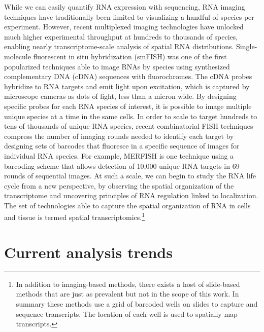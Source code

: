 \begin{dissertationintroduction}
While we can easily quantify RNA expression with sequencing, RNA imaging techniques have traditionally been limited to visualizing a handful of species per experiment. However, recent multiplexed imaging technologies have unlocked much higher experimental throughput at hundreds to thousands of species, enabling nearly transcriptome-scale analysis of spatial RNA distributions. Single-molecule fluorescent in situ hybridization\cite{rajImagingIndividualMRNA2008} (smFISH) was one of the first popularized techniques able to image RNAs by species using synthesized complementary DNA (cDNA) sequences with fluorochromes. The cDNA probes hybridize to RNA targets and emit light upon excitation, which is captured by microscope cameras as dots of light, less than a micron wide. By designing specific probes for each RNA species of interest, it is possible to image multiple unique species at a time in the same cells. In order to scale to target hundreds to tens of thousands of unique RNA species, recent combinatorial FISH techniques compress the number of imaging rounds needed to identify each target by designing sets of barcodes that fluoresce in a specific sequence of images for individual RNA species. For example, MERFISH\cite{chenSpatiallyResolvedHighly2015} is one technique using a barcoding scheme that allows detection of 10,000 unique RNA targets in 69 rounds of sequential images. At such a scale, we can begin to study the RNA life cycle from a new perspective, by observing the spatial organization of the transcriptome and uncovering principles of RNA regulation linked to localization. The set of technologies able to capture the spatial organization of RNA in cells and tissue is termed spatial transcriptomics.\footnote{In addition to imaging-based methods, there exists a host of slide-based methods that are just as prevalent but not in the scope of this work. In summary these methods use a grid of barcoded wells on slides to capture and sequence transcripts. The location of each well is used to spatially map transcripts.}

\section{Current analysis trends}


\end{dissertationintroduction}

